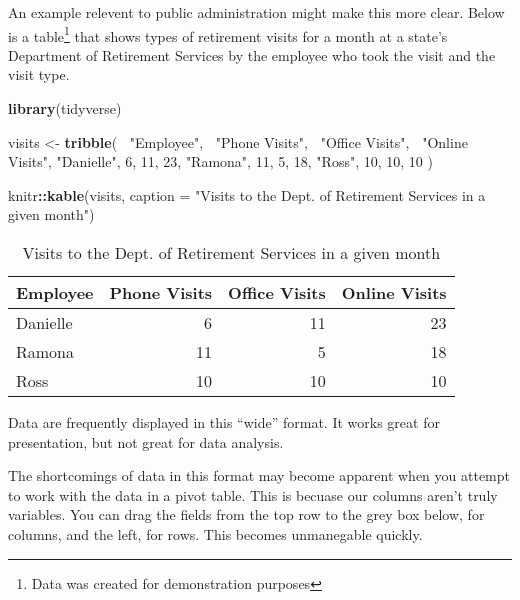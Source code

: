 \documentclass[]{book}
\newenvironment{Shaded}{\begin{snugshade}}{\end{snugshade}}
\newcommand{\KeywordTok}[1]{\textcolor[rgb]{0.13,0.29,0.53}{\textbf{#1}}}
\newcommand{\DataTypeTok}[1]{\textcolor[rgb]{0.13,0.29,0.53}{#1}}
\newcommand{\DecValTok}[1]{\textcolor[rgb]{0.00,0.00,0.81}{#1}}
\newcommand{\StringTok}[1]{\textcolor[rgb]{0.31,0.60,0.02}{#1}}
\newcommand{\OperatorTok}[1]{\textcolor[rgb]{0.81,0.36,0.00}{\textbf{#1}}}
\newcommand{\NormalTok}[1]{#1}
\begin{document}
An example relevent to public administration might make this more clear.
Below is a table\footnote{Data was created for demonstration purposes}
that shows types of retirement visits for a month at a state's
Department of Retirement Services by the employee who took the visit and
the visit type.

\begin{Shaded}
\begin{Highlighting}[]
\KeywordTok{library}\NormalTok{(tidyverse)}

\NormalTok{visits <-}\StringTok{ }\KeywordTok{tribble}\NormalTok{(}
  \OperatorTok{~}\StringTok{"Employee"}\NormalTok{, }\OperatorTok{~}\StringTok{"Phone Visits"}\NormalTok{, }\OperatorTok{~}\StringTok{"Office Visits"}\NormalTok{, }\OperatorTok{~}\StringTok{"Online Visits"}\NormalTok{,}
  \StringTok{"Danielle"}\NormalTok{, }\DecValTok{6}\NormalTok{, }\DecValTok{11}\NormalTok{, }\DecValTok{23}\NormalTok{,}
  \StringTok{"Ramona"}\NormalTok{, }\DecValTok{11}\NormalTok{, }\DecValTok{5}\NormalTok{, }\DecValTok{18}\NormalTok{,}
  \StringTok{"Ross"}\NormalTok{, }\DecValTok{10}\NormalTok{, }\DecValTok{10}\NormalTok{, }\DecValTok{10} 
\NormalTok{)}

\NormalTok{knitr}\OperatorTok{::}\KeywordTok{kable}\NormalTok{(visits, }\DataTypeTok{caption =} \StringTok{"Visits to the Dept. of Retirement Services in a given month"}\NormalTok{)}
\end{Highlighting}
\end{Shaded}

\begin{table}

\caption{\label{tab:tables-visits}Visits to the Dept. of Retirement Services in a given month}
\centering
\begin{tabular}[t]{l|r|r|r}
\hline
Employee & Phone Visits & Office Visits & Online Visits\\
\hline
Danielle & 6 & 11 & 23\\
\hline
Ramona & 11 & 5 & 18\\
\hline
Ross & 10 & 10 & 10\\
\hline
\end{tabular}
\end{table}

Data are frequently displayed in this ``wide'' format. It works great
for presentation, but not great for data analysis.

The shortcomings of data in this format may become apparent when you
attempt to work with the data in a pivot table. This is becuase our
columns aren't truly variables. You can drag the fields from the top row
to the grey box below, for columns, and the left, for rows. This becomes
unmanegable quickly.
\end{document}
